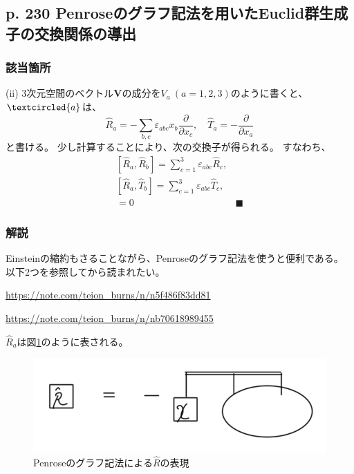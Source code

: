 \documentclass{jsarticle}
\begin{document}
\subsection*{p. 230 Penroseのグラフ記法を用いたEuclid群生成子の交換関係の導出}

\subsubsection*{該当箇所}

(ii) 3次元空間のベクトル$\bm{V}$の成分を$V_a\:(a=1,2,3)$のように書くと、$\textcircled{a}$は、
\begin{equation*}
    \hat{R}_a=-\sum_{b, c}\varepsilon_{abc}x_b\dfrac{\partial}{\partial x_c},\quad \hat{T}_a=-\dfrac{\partial}{\partial x_a}
\end{equation*}
と書ける。
少し計算することにより、次の交換子が得られる。
すなわち、
\begin{equation*}
    \tag{7.36}
    \begin{array}{lr}
        \displaystyle
        [\hat{R}_a, \hat{R}_b]
        =
        \sum_{c=1}^3\varepsilon_{abc}\hat{R}_c,
        \\
        \displaystyle
        [\hat{R}_a, \hat{T}_b]
        =
        \sum_{c=1}^3\varepsilon_{abc}\hat{T}_c,
        \\
        [\hat{T}_a, \hat{T}_b]
        =0
        &\blacksquare
    \end{array}
\end{equation*}

\subsubsection*{解説}

Einsteinの縮約もさることながら、Penroseのグラフ記法を使うと便利である。
以下2つを参照してから読まれたい。

\href{ペンローズのグラフ記法によるベクトル解析の公式の表現 | 低音}{https://note.com/teion_burns/n/n5f486f83dd81}

\href{ペンローズのグラフ記法による完全反対称レヒチビタテンソルの公式の表現 | 低音}{https://note.com/teion_burns/n/nb70618989455}

$\hat{R}_a$は図\ref*{fig:Rhat}のように表される。

\begin{figure}
    \centering
    \includegraphics{Rhat.png}
    \caption{Penroseのグラフ記法による$\hat{R}$の表現}
    \label{fig:Rhat}
\end{figure}
\end{document}
